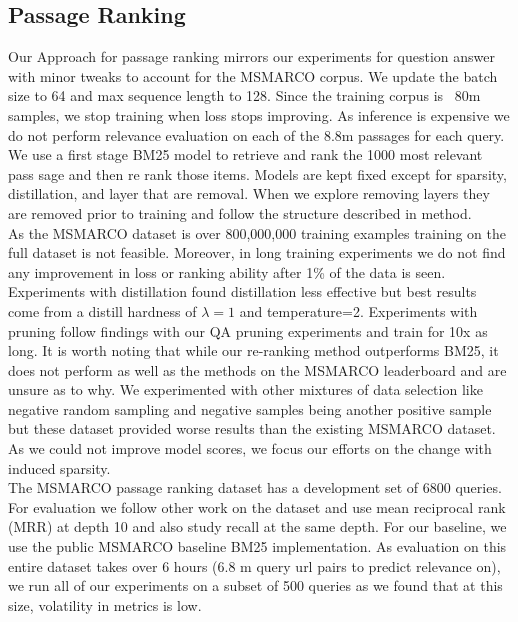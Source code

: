 \subsection{Passage Ranking}
Our Approach for passage ranking mirrors our experiments for question answer with minor tweaks to account for the MSMARCO corpus. We update the batch size to 64 and max sequence length to 128. Since the training corpus is ~80m samples, we stop training when loss stops improving. As inference is expensive we do not perform relevance evaluation on each of the 8.8m passages for each query. We use a first stage BM25 model to retrieve and rank the 1000 most relevant pass sage and then re rank those items.  Models are kept fixed except for sparsity, distillation, and layer that are removal. When we explore removing layers they are removed prior to training and follow the structure described in method. \\
As the MSMARCO dataset is over 800,000,000 training examples training on the full dataset is not feasible. Moreover, in long training experiments we do not find any improvement in loss or ranking ability after 1\% of the data is seen. Experiments with distillation found distillation less effective but best results come from a distill hardness of $\lambda=1$ and temperature=2. Experiments with pruning follow findings with our QA pruning experiments and train for 10x as long. It is worth noting that while our re-ranking method outperforms BM25, it does not perform as well as the methods on the MSMARCO leaderboard and are unsure as to why. We experimented with other mixtures of data selection like negative random sampling and negative samples being another positive sample but these dataset provided worse results than the existing MSMARCO dataset. As we could not improve model scores, we focus our efforts on the change with induced sparsity.  \\
The MSMARCO passage ranking dataset has a development set of 6800 queries. For evaluation we follow other work on the dataset and use mean reciprocal rank (MRR) at depth 10 and also study recall at the same depth. For our baseline, we use the public MSMARCO baseline BM25 implementation. As evaluation on this entire dataset takes over 6 hours (6.8 m query url pairs to predict relevance on), we run all of our experiments on a subset of 500 queries as we found that at this size, volatility in metrics is low.\\
